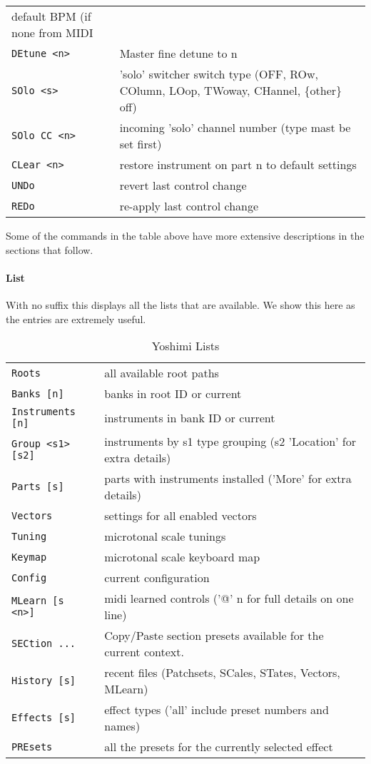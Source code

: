 \begin{center}
\begin{longtable}{p{6cm} p{10cm}}
   default BPM (if none from MIDI \\
\texttt{DEtune <n>} &
   Master fine detune to n \\
\texttt{SOlo <s>} &
   'solo' switcher switch type (OFF, ROw, COlumn, LOop, TWoway, CHannel,
   \{other\} off) \\
\texttt{SOlo CC <n>} &
   incoming 'solo' channel number (type mast be set first) \\
\texttt{CLear <n>} &
   restore instrument on part n to default settings \\
\texttt{UNDo} &
   revert last control change \\
\texttt{REDo} &
   re-apply last control change \\

\end{longtable}
\end{center}

   Some of the commands in the table above have more extensive descriptions
   in the sections that follow.

\paragraph{List}
\label{paragraph:command_line_list}
   With no suffix this displays all the lists that are available. We show
   this here as the entries are extremely useful.
\begin{center}
\begin{longtable}{p{6cm} p{10cm}}
\caption[Yoshimi Lists]{Yoshimi Lists} \\
\texttt{Roots} &
   all available root paths \\
\texttt{Banks [n]} &
   banks in root ID or current \\
\texttt{Instruments [n]} &
   instruments in bank ID or current \\
\texttt{Group <s1> [s2]} &
   instruments by s1 type grouping (s2 'Location' for extra details) \\
\texttt{Parts [s]} &
   parts with instruments installed ('More' for extra details) \\
\texttt{Vectors} &
   settings for all enabled vectors \\
\texttt{Tuning} &
   microtonal scale tunings \\
\texttt{Keymap} &
   microtonal scale keyboard map \\
\texttt{Config} &
   current configuration \\
\texttt{MLearn [s <n>]} &
   midi learned controls ('@' n for full details on one line) \\
\texttt{SECtion ...} &
   Copy/Paste section presets available for the current context. \\
\texttt{History [s]} &
   recent files (Patchsets, SCales, STates, Vectors, MLearn) \\
\texttt{Effects [s]} &
   effect types ('all' include preset numbers and names) \\
\texttt{PREsets } &
  all the presets for the currently selected effect \\
\end{longtable}
\end{center}
